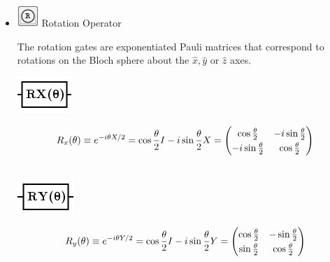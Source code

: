 \documentclass[10pt]{article}
\theoremstyle{definition}
\begin{document}
\begin{itemize}
\item \includegraphics{Figures/Gates/RotationGate.png}  Rotation Operator

The rotation gates are exponentiated Pauli matrices that correspond to rotations on the Bloch sphere about the $\hat{x}, \hat{y}$ or $\hat{z}$ axes.

\begin{center}
\includegraphics[scale=.7]{Figures/Gates/RotXGateViewer} 
  \begin{minipage}{.9\linewidth}
    \begin{equation*} \label{mat:rotX}
    \renewcommand{\arraystretch}{1.25}
 R_x(\theta) \equiv e^{-i\theta X/2} = \cos\frac{\theta}{2} I - i \sin \frac{\theta}{2} X =  \begin{pmatrix} \cos \frac{\theta}{2} & -i\sin\frac{\theta}{2} \\ -i\sin\frac{\theta}{2} & \cos\frac{\theta}{2}\end{pmatrix}
    \end{equation*}
  \end{minipage}\hspace{-2.5cm}
  \begin{minipage}{.2\linewidth}
  \vspace*{3pt}
    \begin{align}
    \end{align}
  \end{minipage}
\end{center}

\begin{center}
\includegraphics[scale=.7]{Figures/Gates/RotYGateViewer}  
  \begin{minipage}{.9\linewidth}
    \begin{equation*} \label{mat:rotY}
    \renewcommand{\arraystretch}{1.25}
R_y(\theta) \equiv e^{-i\theta Y/2} = \cos\frac{\theta}{2} I - i \sin \frac{\theta}{2} Y =  \begin{pmatrix} \cos \frac{\theta}{2} & -\sin\frac{\theta}{2} \\ \sin\frac{\theta}{2} & \cos\frac{\theta}{2}\end{pmatrix}
    \end{equation*}
  \end{minipage}\hspace{-2.5cm}
  \begin{minipage}{.2\linewidth}
  \vspace*{3pt}
    \begin{align}
    \end{align}
  \end{minipage}
\end{center}


\end{itemize}
\end{document}
